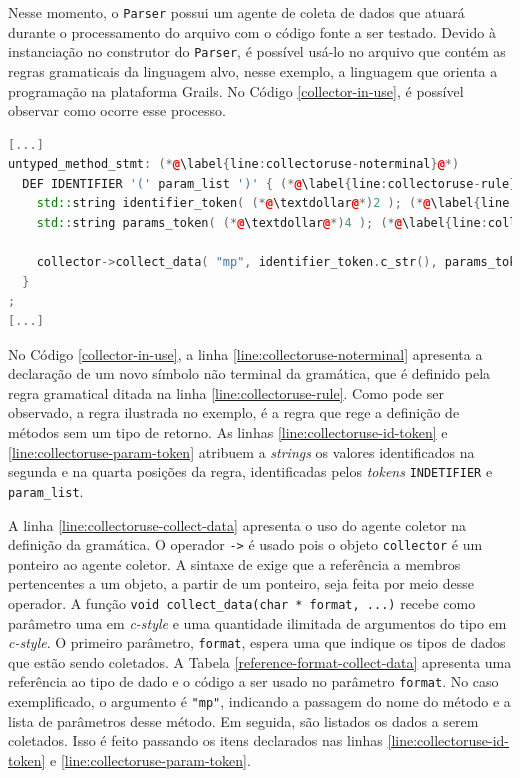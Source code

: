 Nesse momento, o \lstinline|Parser| possui um agente de coleta de dados que atuará durante
o processamento do arquivo com o código fonte a ser testado. Devido à instanciação
no construtor do \lstinline|Parser|, é possível usá-lo no arquivo que contém as regras
gramaticais da linguagem alvo, nesse exemplo, a linguagem que orienta a programação na plataforma \textsf{Grails}. No Código
\ref{collector-in-use}, é possível observar como ocorre esse processo.

\begin{lstlisting}[language=C++, label=collector-in-use, caption=Agente coletor em uso no \parser]
[...]
untyped_method_stmt: (*@\label{line:collectoruse-noterminal}@*)
  DEF IDENTIFIER '(' param_list ')' { (*@\label{line:collectoruse-rule}@*)
    std::string identifier_token( (*@\textdollar@*)2 ); (*@\label{line:collectoruse-id-token}@*)
    std::string params_token( (*@\textdollar@*)4 ); (*@\label{line:collectoruse-param-token}@*)

    collector->collect_data( "mp", identifier_token.c_str(), params_token.c_str() ); (*@\label{line:collectoruse-collect-data}@*)
  }
;
[...]
\end{lstlisting}

No Código \ref{collector-in-use}, a linha \ref{line:collectoruse-noterminal}
apresenta a declaração de um novo símbolo não terminal da gramática, que é
definido pela regra gramatical ditada na linha \ref{line:collectoruse-rule}.
 Como pode ser observado, a regra ilustrada no exemplo, é a regra que rege a definição de métodos sem um tipo de retorno. As linhas \ref{line:collectoruse-id-token} e
\ref{line:collectoruse-param-token} atribuem a \textit{strings} os valores
identificados na segunda e na quarta posições da regra, identificadas pelos
\textit{tokens} \lstinline|INDETIFIER| e \lstinline|param_list|.

A linha \ref{line:collectoruse-collect-data} apresenta o uso do agente coletor
na definição da gramática. O operador \lstinline|->| é usado pois o objeto
\lstinline|collector| é um ponteiro ao agente coletor. A sintaxe de \cpp exige
que a referência a membros pertencentes a um objeto, a partir de um ponteiro, seja
feita por meio desse operador. A função \lstinline|void collect_data(char * format, ...)|
recebe como parâmetro uma \str em \textit{c-style} e uma quantidade ilimitada de
argumentos do tipo \str em \textit{c-style}. O primeiro parâmetro, \lstinline|format|, espera
uma \str que indique os tipos de dados que estão sendo coletados. A Tabela
\ref{reference-format-collect-data} apresenta uma referência ao tipo de dado e
o código a ser usado no parâmetro \lstinline|format|. No caso exemplificado,
o argumento é \lstinline|"mp"|, indicando a passagem do nome do método e a
lista de parâmetros desse método. Em seguida, são listados os dados a serem coletados.
Isso é feito passando os itens declarados nas linhas
\ref{line:collectoruse-id-token} e \ref{line:collectoruse-param-token}.

